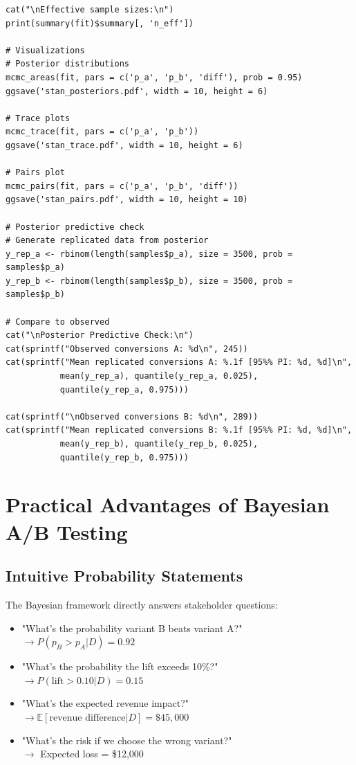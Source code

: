 \begin{lstlisting}
cat("\nEffective sample sizes:\n")
print(summary(fit)$summary[, 'n_eff'])

# Visualizations
# Posterior distributions
mcmc_areas(fit, pars = c('p_a', 'p_b', 'diff'), prob = 0.95)
ggsave('stan_posteriors.pdf', width = 10, height = 6)

# Trace plots
mcmc_trace(fit, pars = c('p_a', 'p_b'))
ggsave('stan_trace.pdf', width = 10, height = 6)

# Pairs plot
mcmc_pairs(fit, pars = c('p_a', 'p_b', 'diff'))
ggsave('stan_pairs.pdf', width = 10, height = 10)

# Posterior predictive check
# Generate replicated data from posterior
y_rep_a <- rbinom(length(samples$p_a), size = 3500, prob = samples$p_a)
y_rep_b <- rbinom(length(samples$p_b), size = 3500, prob = samples$p_b)

# Compare to observed
cat("\nPosterior Predictive Check:\n")
cat(sprintf("Observed conversions A: %d\n", 245))
cat(sprintf("Mean replicated conversions A: %.1f [95%% PI: %d, %d]\n",
           mean(y_rep_a), quantile(y_rep_a, 0.025),
           quantile(y_rep_a, 0.975)))

cat(sprintf("\nObserved conversions B: %d\n", 289))
cat(sprintf("Mean replicated conversions B: %.1f [95%% PI: %d, %d]\n",
           mean(y_rep_b), quantile(y_rep_b, 0.025),
           quantile(y_rep_b, 0.975)))
\end{lstlisting}

\section{Practical Advantages of Bayesian A/B Testing}

\subsection{Intuitive Probability Statements}

The Bayesian framework directly answers stakeholder questions:

\begin{itemize}
    \item "What's the probability variant B beats variant A?" \\
    $\to P(p_B > p_A | D) = 0.92$

    \item "What's the probability the lift exceeds 10\%?" \\
    $\to P(\text{lift} > 0.10 | D) = 0.15$

    \item "What's the expected revenue impact?" \\
    $\to \mathbb{E}[\text{revenue difference} | D] = \$45,000$

    \item "What's the risk if we choose the wrong variant?" \\
    $\to$ Expected loss = \$12,000
\end{itemize}

